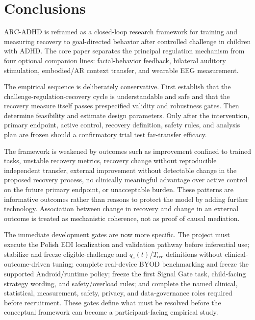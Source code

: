 \section{Conclusions}

ARC-ADHD is reframed as a closed-loop research framework for training and measuring recovery to goal-directed behavior after controlled challenge in children with ADHD. The core paper separates the principal regulation mechanism from four optional companion lines: facial-behavior feedback, bilateral auditory stimulation, embodied/AR context transfer, and wearable EEG measurement.

The empirical sequence is deliberately conservative. First establish that the challenge-regulation-recovery cycle is understandable and safe and that the recovery measure itself passes prespecified validity and robustness gates. Then determine feasibility and estimate design parameters. Only after the intervention, primary endpoint, active control, recovery definition, safety rules, and analysis plan are frozen should a confirmatory trial test far-transfer efficacy.

The framework is weakened by outcomes such as improvement confined to trained tasks, unstable recovery metrics, recovery change without reproducible independent transfer, external improvement without detectable change in the proposed recovery process, no clinically meaningful advantage over active control on the future primary endpoint, or unacceptable burden. These patterns are informative outcomes rather than reasons to protect the model by adding further technology. Association between change in recovery and change in an external outcome is treated as mechanistic coherence, not as proof of causal mediation.

The immediate development gates are now more specific. The project must execute the Polish EDI localization and validation pathway before inferential use; stabilize and freeze eligible-challenge and \(q_e(t)\)/\(T_{\mathrm{rec}}\) definitions without clinical-outcome-driven tuning; complete real-device BYOD benchmarking and freeze the supported Android/runtime policy; freeze the first Signal Gate task, child-facing strategy wording, and safety/overload rules; and complete the named clinical, statistical, measurement, safety, privacy, and data-governance roles required before recruitment. These gates define what must be resolved before the conceptual framework can become a participant-facing empirical study.
